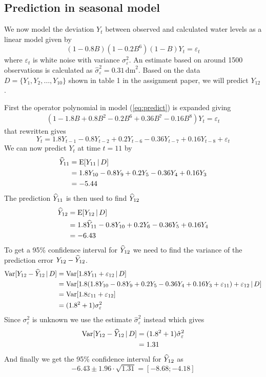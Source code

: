 \subsection*{Prediction in seasonal model}
We now model the deviation $Y_t$ between observed and calculated water levels as a linear model given by
\begin{equation}\label{eq:predict}
    (1-0.8B)(1-0.2B^6)(1-B)Y_t = \varepsilon_t
\end{equation}
where $\varepsilon_t$ is white noise with variance $\sigma^2_\varepsilon$. An estimate based on around 1500 observations is calculated as $\hat{\sigma}^2_\varepsilon=0.31\,\text{dm}^2$. Based on the data $D=\{Y_1, Y_2, \dots, Y_{10}\}$ shown in table 1 in the assignment paper, we will predict $Y_{12}$.\par
First the operator polynomial in model (\ref{eq:predict}) is expanded giving
\begin{align*}
    (1 - 1.8B + 0.8B^2 - 0.2B^6 + 0.36B^7 - 0.16B^8)Y_t = \varepsilon_t 
\end{align*}
that rewritten gives 
\begin{equation*}
    Y_t = 1.8Y_{t-1} - 0.8Y_{t-2} + 0.2Y_{t-6} - 0.36Y_{t-7} + 0.16Y_{t-8} + \varepsilon_t
\end{equation*}
We can now predict $Y_t$ at time $t=11$ by
\begin{align*}
    \widehat{Y}_{11} &= \text{E}[Y_{11}\,|\, D]\\
    &= 1.8Y_{10} - 0.8Y_9 + 0.2Y_5 -0.36Y_4 + 0.16Y_3\\
    &= -5.44
\end{align*}
The prediction $\widehat{Y}_{11}$ is then used to find $\widehat{Y}_{12}$
\begin{align*}
    \widehat{Y}_{12} &= \text{E}[Y_{12}\,|\, D] \\
    &= 1.8\widehat{Y}_{11} - 0.8Y_{10} + 0.2Y_6 - 0.36Y_5 + 0.16Y_4 \\
    &= -6.43
\end{align*}
To get a 95\% confidence interval for $\widehat{Y}_{12}$ we need to find the variance of the prediction error $Y_{12}-\widehat{Y}_{12}$.
\begin{align*}
    \text{Var}[Y_{12} - \widehat{Y}_{12}\,|\, D] &= \text{Var}[1.8Y_{11} + \varepsilon_{12}\,|\, D] \\
    &= \text{Var}[1.8(1.8Y_{10} - 0.8Y_9 + 0.2Y_5 -0.36Y_4 + 0.16Y_3 + \varepsilon_{11}) + \varepsilon_{12}\,|\, D] \\
    &= \text{Var}[1.8\varepsilon_{11} + \varepsilon_{12}] \\
    &= (1.8^2 + 1)\sigma^2_\varepsilon
\end{align*}
Since $\sigma^2_\varepsilon$ is unknown we use the estimate $\hat{\sigma}^2_\varepsilon$ instead which gives
\begin{align*}
    \text{Var}[Y_{12} - \widehat{Y}_{12}\,|\, D] &= (1.8^2 + 1)\hat{\sigma}^2_\varepsilon \\
    &= 1.31
\end{align*}
And finally we get the 95\% confidence interval for $\widehat{Y}_{12}$ as
\begin{equation*}
    -6.43\pm 1.96\cdot\sqrt{1.31} = [-8.68; -4.18]
\end{equation*}

